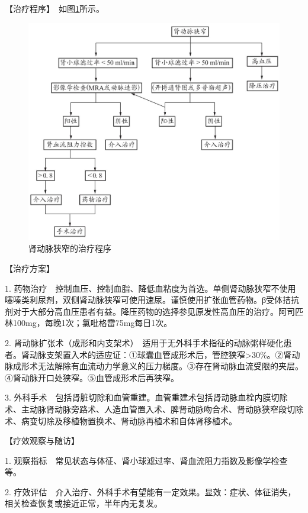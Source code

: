 【治疗程序】　如图\ref{fig4-6-1}所示。

\begin{figure}[!htbp]
 \centering
 \includegraphics{./images/Image00129.jpg}
 \captionsetup{justification=centering}
 \caption{肾动脉狭窄的治疗程序}
 \label{fig4-6-1}
  \end{figure} 

【治疗方案】

1.
药物治疗　控制血压、控制血脂、降低血粘度为首选。单侧肾动脉狭窄不使用噻嗪类利尿剂，双侧肾动脉狭窄可使用速尿。谨慎使用扩张血管药物。β受体拮抗剂对于大部分高血压患者有益。降压药物的选择参见原发性高血压的治疗。阿司匹林100mg，每晚1次；氯吡格雷75mg每日1次。

2.
肾动脉扩张术（成形和内支架术）　适用于无外科手术指征的动脉粥样硬化患者。肾动脉支架置入术的适应证：①球囊血管成形术后，管腔狭窄\textgreater{}30\%。②肾动脉成形术无法解除有血流动力学意义的压力梯度。③存在肾动脉血流受限的夹层。④肾动脉开口处狭窄。⑤血管成形术后再狭窄。

3.
外科手术　包括肾脏切除和血管重建。血管重建术包括肾动脉血栓内膜切除术、主动脉肾动脉旁路术、人造血管置入术、脾肾动脉吻合术、肾动脉狭窄段切除术、病变切除及移植物置换术、肾动脉再植术和自体肾移植术。

【疗效观察与随访】

1.
观察指标　常见状态与体征、肾小球滤过率、肾血流阻力指数及影像学检查等。

2.
疗效评估　介入治疗、外科手术有望能有一定效果。显效：症状、体征消失，相关检查恢复或接近正常，半年内无复发。

